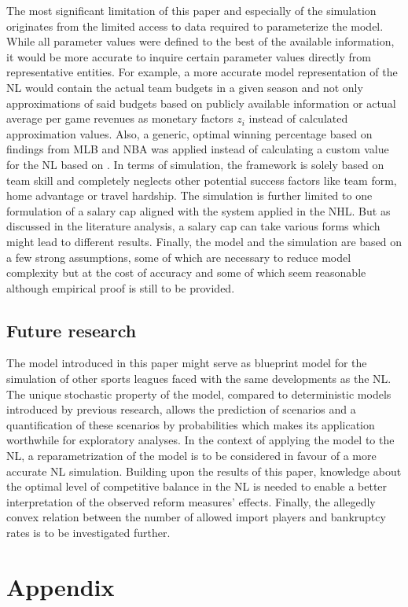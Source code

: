 \documentclass[12pt, a4paper]{article}
\begin{document}
The most significant limitation of this paper and especially of the simulation originates from the limited access to data required to parameterize the model. While all parameter values were defined to the best of the available information, it would be more accurate to inquire certain parameter values directly from representative entities. For example, a more accurate model representation of the NL would contain the actual team budgets in a given season and not only approximations of said budgets based on publicly available information or actual average per game revenues as monetary factors $z_i$ instead of calculated approximation values. Also, a generic, optimal winning percentage based on findings from MLB and NBA was applied instead of calculating a custom value for the NL based on \citet{kesenne_optimal_2015}. In terms of simulation, the framework is solely based on team skill and completely neglects other potential success factors like team form, home advantage or travel hardship. The simulation is further limited to one formulation of a salary cap aligned with the system applied in the NHL. But as discussed in the literature analysis, a salary cap can take various forms which might lead to different results. Finally, the model and the simulation are based on a few strong assumptions, some of which are necessary to reduce model complexity but at the cost of accuracy and some of which seem reasonable although empirical proof is still to be provided.

\subsection{Future research}

The model introduced in this paper might serve as blueprint model for the simulation of other sports leagues faced with the same developments as the NL. The unique stochastic property of the model, compared to deterministic models introduced by previous research, allows the prediction of scenarios and a quantification of these scenarios by probabilities which makes its application worthwhile for exploratory analyses. In the context of applying the model to the NL, a reparametrization of the model is to be considered in favour of a more accurate NL simulation. Building upon the results of this paper, knowledge about the optimal level of competitive balance in the NL is needed to enable a better interpretation of the observed reform measures' effects. Finally, the allegedly convex relation between the number of allowed import players and bankruptcy rates is to be investigated further. 

\newpage

\renewcommand{\BRetrievedFrom}{}


\newpage

\titlespacing*{\section}{0pt}{0pt}{1cm}
\appendix

\section{Appendix}


\end{document}
